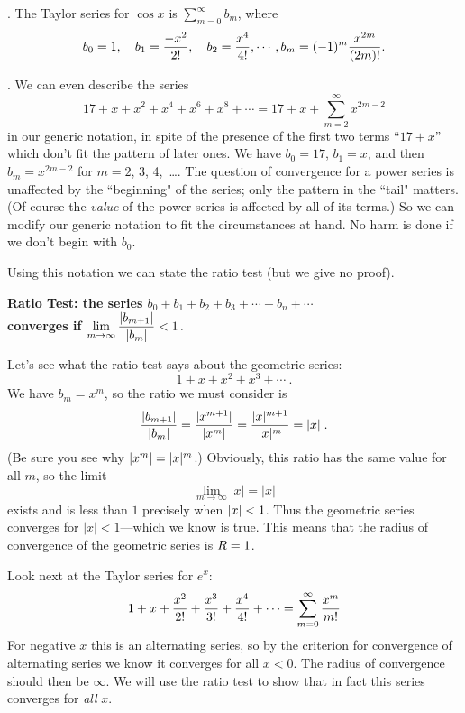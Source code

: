 {{{{.  The Taylor series for $\cos x$ is ${\displaystyle \sum_{m=0}^\infty b_m}$, where
\[
b_0 = 1, \quad b_1 = {-x^2 \over 2!}, \quad b_2 = {x^4 \over 4!}, \cdots ,
b_m = (-1)^m {x^{2m} \over (2m)!} .
\]

.  We can even describe the series
\[
17 + x + x^2 + x^4 + x^6 + x^8 + \cdots = 17 + x + \sum_{m=2}^\infty x^{2m-2}
\]
in our generic notation, in spite of the presence of the first two terms ``$17 + x$'' which don't fit the pattern of later ones.  We have $b_0 = 17$, $b_1 = x$, and then $b_m = x^{2m-2}$ for $m = 2$, 3, 4,~\ldots .  The question of convergence for a power series is 
unaffected by the ``beginning" of the series; only the pattern in the ``tail" matters.  (Of course the {\em value\/} of the power series is affected by all of its terms.)  So we can modify our generic notation to fit the circumstances at hand.  No harm is done if we don't begin with $b_0$.


        Using this notation we can state the ratio test (but we give no proof).

\begin{observation}
\bf Ratio Test: the series \boldmath 
                        $b_0 + b_1 + b_2 + b_3 + \cdots + b_n + 
                        \cdots$\\
\bf converges if \boldmath ${\displaystyle 
                        \lim_{m \to \infty}{|b_{m+1}| \over |b_m|} 
                        < 1 \, .}$
\end{observation}

\noindent
Let's see what the ratio test says about the geometric series:
\[
1 + x + x^2 + x^3 + \cdots \ .
\]
We have $b_m = x^m$, so the ratio we must consider is
\[
{|b_{m+1}| \over |b_m|} = {|x^{m+1}| \over |x^m|} = {|x|^{m+1} \over |x|^m} = |x| \; .
\]
\noindent (Be sure you see why $|x^m| = |x|^m\/$.)  Obviously, this ratio has the same value for all $m$, so the limit
\[
\lim_{m \to \infty} |x| = |x|
\]
exists and is less than $1$ precisely when $|x| < 1\/$.  Thus the geometric series converges for
$|x| < 1$---which we know is true.  This means that the radius of convergence of the geometric series is $R=1\/$.


Look next at the Taylor series for $e^x$:
\[
1 + x + {\displaystyle {x^2 \over 2!}} + {\displaystyle {x^3 \over 3!}} + {\displaystyle {x^4 \over 4!}} + \cdots = \sum_{m=0}^{\infty} {\displaystyle {x^m \over m!}}
\]
For negative $x$ this is an alternating series, so by the criterion for convergence of alternating series we know it converges for all $x < 0$.  The radius of convergence should then be $\infty$.  We will use the ratio test to show that in fact this series converges for {\em all\/} $x$.

}}}}
